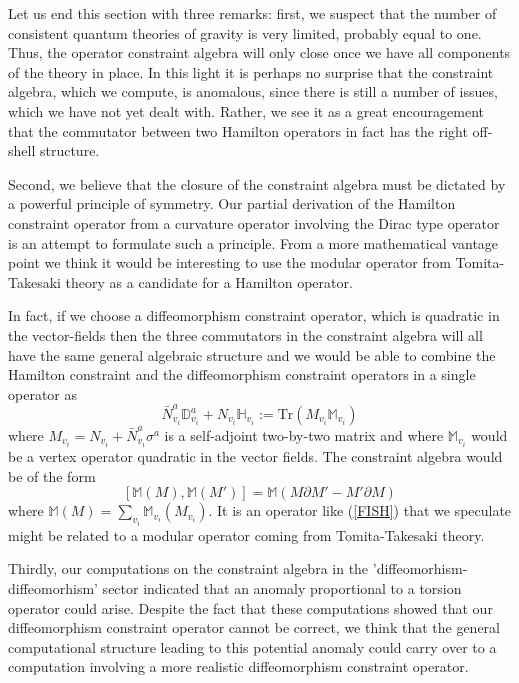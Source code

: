 \documentclass[12pt]{article}
\newcommand{\pa}{\partial}
\begin{document}
Let us end this section with three remarks: first, we suspect that the number of consistent quantum theories of gravity is very limited, probably equal to one. Thus, the operator constraint algebra will only close once we have all components of the theory in place. In this light it is perhaps no surprise that the constraint algebra, which we compute, is anomalous, since there is still a number of issues, which we have not yet dealt with. Rather, we see it as a great encouragement that the commutator between two Hamilton operators in fact has the right off-shell structure.

Second, we believe that the closure of the constraint algebra must be dictated by a powerful principle of symmetry. Our partial derivation of the Hamilton constraint operator from a curvature operator involving the Dirac type operator is an attempt to formulate such a principle. From a more mathematical vantage point we think it would be interesting to use the modular operator from Tomita-Takesaki theory as a candidate for a Hamilton operator. %

In fact, if we choose a diffeomorphism constraint operator, which is quadratic in the vector-fields then the three commutators in the constraint algebra will all have the same general algebraic structure and we would be able to combine the Hamilton constraint and the diffeomorphism constraint operators in a single operator as
\begin{equation}
\bar{N}^a_{v_i} \mathds{D}^a_{v_i}  + N_{v_i}  \mathds{H}_{v_i} := \mbox{Tr}  \left( M_{v_i} \mathds{M}_{v_i}   \right)
\label{FISH}
\end{equation}
where $M_{v_i}= N_{v_i} + \bar{N}^a_{v_i} \sigma^a$ is a self-adjoint two-by-two matrix and where $\mathds{M}_{v_i} $ would be a vertex operator quadratic in the vector fields. The constraint algebra would be of the form
$$
[\mathds{M}(M), \mathds{M}(M')] = \mathds{M}( M \pa M' - M'\pa M)
$$
where $\mathds{M}(M)= \sum_{v_i} \mathds{M}_{v_i}(M_{v_i})$.
It is an operator like (\ref{FISH}) that we speculate might be related to a modular operator coming from Tomita-Takesaki theory. 

Thirdly, our computations on the constraint algebra in the 'diffeomorhism-diffeomorhism' sector indicated that an anomaly proportional to a torsion operator could arise. Despite the fact that these computations showed that our diffeomorphism constraint operator cannot be correct, we think that the general computational structure leading to this potential anomaly could carry over to a computation involving a more realistic diffeomorphism constraint operator.
\end{document}
